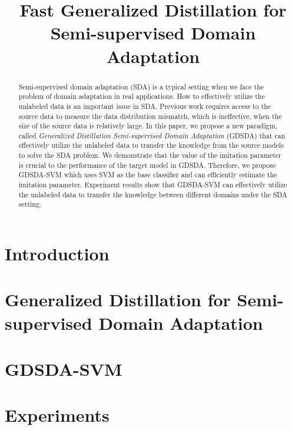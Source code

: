 \documentclass{llncs}
\begin{document}
\title{Fast Generalized Distillation for Semi-supervised Domain Adaptation}
\maketitle
\begin{abstract}
	Semi-supervised domain adaptation (SDA) is a typical setting when we face the problem of domain adaptation in real applications. How to effectively utilize the unlabeled data is an important issue in SDA.
	Previous work requires access to the source data to measure the data distribution mismatch, which is ineffective, when the size of the source data is relatively large.
	In this paper, we propose a new paradigm, called \textit{Generalized Distillation Semi-supervised Domain Adaptation} (GDSDA) that can effectively utilize the unlabeled data to transfer the knowledge from the source models to solve the SDA problem. We demonstrate that the value of the imitation parameter is crucial to the performance of the target model in GDSDA. Therefore, we propose GDSDA-SVM which uses SVM as the base classifier and can efficiently estimate the imitation parameter.  
	Experiment results show that GDSDA-SVM can effectively utilize the unlabeled data to transfer the knowledge between different domains under the SDA setting.
\end{abstract}

\section{Introduction}



%

\section{Generalized Distillation for Semi-supervised Domain Adaptation}\label{sec:gdda}



\section{GDSDA-SVM}\label{sec:svm}


\section{Experiments}\label{sec:exp}

\end{document}
